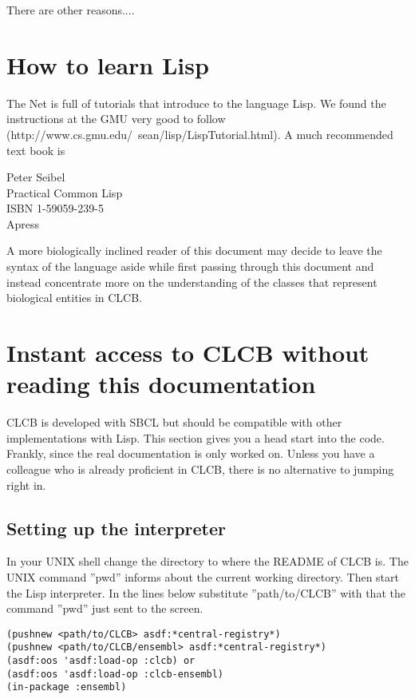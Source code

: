 \documentclass{book}
\begin{document}
There are other reasons....

\section{How to learn Lisp}

The Net is full of tutorials that introduce to the language
Lisp. We found the instructions at the GMU very good to follow
(http://www.cs.gmu.edu/~sean/lisp/LispTutorial.html). A much recommended
text book is

	Peter Seibel\\
	Practical Common Lisp\\
	ISBN 1-59059-239-5\\
	Apress

A more biologically inclined reader of this document may decide
to leave the syntax of the language aside while first passing through
this document and instead concentrate more on the understanding
of the classes that represent biological entities in CLCB.

\section{Instant access to CLCB without reading this documentation}

CLCB is developed with SBCL but should be compatible with other
implementations with Lisp. This section gives you a head start into the
code. Frankly, since the real documentation is only worked on.
Unless you have a colleague who is already proficient in CLCB, 
there is no alternative to jumping right in.

\subsection{Setting up the interpreter}

In your UNIX shell change the directory to where the README 
of CLCB is. The UNIX command ''pwd'' informs about the current
working directory. Then start the Lisp interpreter. In the lines below
substitute ''path/to/CLCB'' with that the command ''pwd'' just sent to
the screen.

\lstset{language=lisp}
\begin{lstlisting}
(pushnew <path/to/CLCB> asdf:*central-registry*)
(pushnew <path/to/CLCB/ensembl> asdf:*central-registry*)
(asdf:oos 'asdf:load-op :clcb) or
(asdf:oos 'asdf:load-op :clcb-ensembl)
(in-package :ensembl)
\end{lstlisting}
\end{document}
